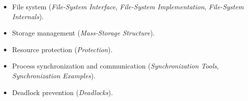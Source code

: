 \documentclass{article}
\begin{document}
\begin{itemize}
\begin{itemize}
\begin{itemize}
            \item File system (\textit{File-System Interface}, \textit{File-System Implementation}, \textit{File-System Internals}).
            \item Storage management (\textit{Mass-Storage Structure}).
            \item Resource protection (\textit{Protection}).
            \item Process synchronization and communication (\textit{Synchronization Tools}, \textit{Synchronization Examples}).
            \item Deadlock prevention (\textit{Deadlocks}).
        \end{itemize}
    \end{itemize}
\end{itemize}
\end{document}
